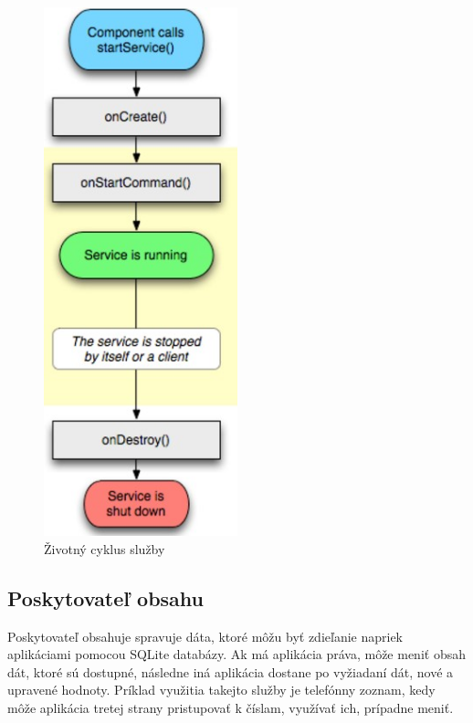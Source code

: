 \begin{figure}[H]
    \begin{center}
        \begin{minipage}{0.5\linewidth}
            \begin{center}
                \includegraphics[width=0.5\textwidth]{images/service_life.jpg}
                \caption{Životný cyklus služby}
                \label{obr1.3}
            \end{center}
        \end{minipage}
    \end{center}
\end{figure}

\subsection{Poskytovateľ obsahu}
Poskytovateľ obsahuje spravuje dáta, ktoré môžu byť zdieľanie napriek aplikáciami pomocou  SQLite databázy. Ak má aplikácia práva, môže meniť obsah dát, ktoré sú dostupné, následne iná aplikácia dostane po vyžiadaní dát, nové a upravené hodnoty. Príklad využitia takejto služby je telefónny zoznam, kedy môže aplikácia tretej strany pristupovať k číslam, využívať ich, prípadne meniť.

